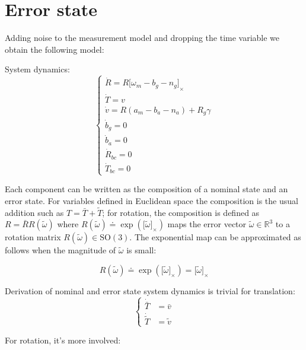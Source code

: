 \documentclass[letter,10pt]{article}
\newcommand{\SO}[1]{ \mathrm{SO(#1)} }
\newcommand{\real}{\mathbb{R}}
\newcommand{\asym}[1]{{\lbrack #1\rbrack}_\times{}}
\begin{document}
\section{Error state}
\label{sect-model}

Adding noise to the measurement model and dropping the time variable we obtain the following model:

System dynamics:
\begin{equation}
 \begin{cases}
 \dot R = R \asym{\omega_m-b_g-n_g}\\
 \dot T = v\\
 \dot v = R(a_m-b_a-n_a) + R_g \gamma \\
 \dot b_g = 0 \\
 \dot b_a = 0 \\
 \dot R_{bc} = 0 \\
 \dot T_{bc} = 0
 \end{cases}
\end{equation}

Each component can be written as the composition of a nominal state and an error state. For variables defined in Euclidean space the composition is the usual addition such as $T=\bar T + \tilde T$; for rotation, the composition is defined as $R=\bar R R(\tilde \omega)$ where $R(\tilde \omega)\doteq \exp(\asym{\tilde \omega})$ maps the error vector $\tilde \omega \in \real^3$ to a rotation matrix $R(\tilde \omega) \in \SO{3}$. The exponential map can be approximated as follows when the magnitude of $\tilde \omega$ is small:

\begin{equation}
R(\tilde \omega) \doteq \exp(\asym{\tilde \omega})=\asym{\tilde \omega}
\end{equation}


Derivation of nominal and error state system dynamics is trivial for translation:
\begin{equation}
\begin{cases}
\dot{\bar T} &= \bar v\\
\dot{\tilde T} &= \tilde v
\end{cases}
\end{equation}

For rotation, it's more involved:
\end{document}
